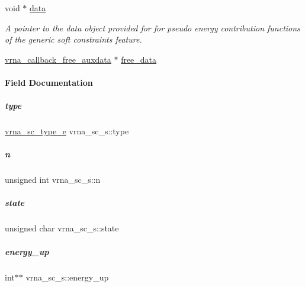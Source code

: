 \begin{DoxyCompactItemize}
void $\ast$ \mbox{\hyperlink{group__soft__constraints_a7574680143df97b9029146c2150bf06d}{data}}
\begin{DoxyCompactList}\small\item\em A pointer to the data object provided for for pseudo energy contribution functions of the generic soft constraints feature. \end{DoxyCompactList}\item 
\mbox{\hyperlink{group__fold__compound_ga7806651f51b195013839a218b3bbd5a3}{vrna\+\_\+callback\+\_\+free\+\_\+auxdata}} $\ast$ \mbox{\hyperlink{group__soft__constraints_a05031f5e9e1db014cbae7e8c08048291}{free\+\_\+data}}
\end{DoxyCompactItemize}


\paragraph{Field Documentation}
\mbox{\label{group__soft__constraints_a57cecd53f01168c71834a93277dc73c6}} 
\subparagraph{\texorpdfstring{type}{type}}
{\footnotesize\ttfamily \mbox{\hyperlink{constraints__soft_8h_ab926b4d8c342aa5fb2f8f007200635a8}{vrna\+\_\+sc\+\_\+type\+\_\+e}} vrna\+\_\+sc\+\_\+s\+::type}

\mbox{\label{group__soft__constraints_ab47470efd4ee0211ca78641f57009def}} 
\subparagraph{\texorpdfstring{n}{n}}
{\footnotesize\ttfamily unsigned int vrna\+\_\+sc\+\_\+s\+::n}

\mbox{\label{group__soft__constraints_a0b46b319b627a4de54deabf2358368a9}} 
\subparagraph{\texorpdfstring{state}{state}}
{\footnotesize\ttfamily unsigned char vrna\+\_\+sc\+\_\+s\+::state}

\mbox{\label{group__soft__constraints_a57e4dbb924ab11f304e3762a3a9b07a1}} 
\subparagraph{\texorpdfstring{energy\+\_\+up}{energy\_up}}
{\footnotesize\ttfamily int$\ast$$\ast$ vrna\+\_\+sc\+\_\+s\+::energy\+\_\+up}



